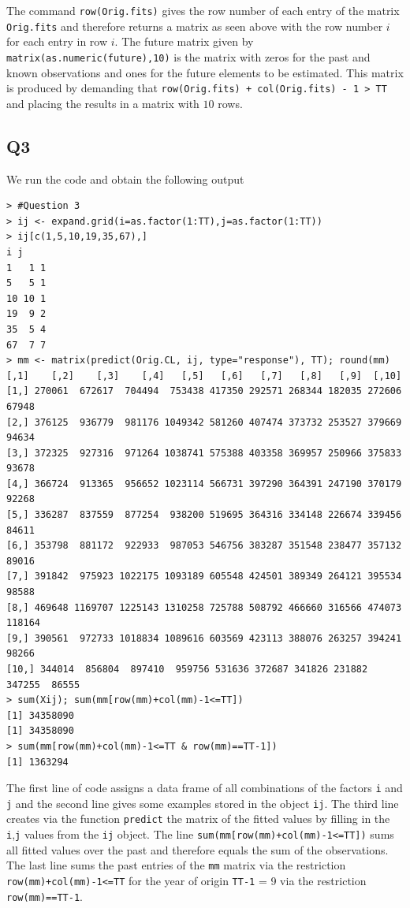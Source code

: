 \documentclass[11pt]{article}
\begin{document}
The command \verb|row(Orig.fits)| gives the row number of each entry of the matrix \verb|Orig.fits| and therefore returns a matrix as seen above with the row number $i$ for each entry in row $i$. The future matrix given by \verb|matrix(as.numeric(future),10)| is the matrix with zeros for the past and known observations and ones for the future elements to be estimated. This matrix is produced by demanding that \verb|row(Orig.fits) + col(Orig.fits) - 1 > TT| and placing the results in a matrix with $10$ rows.


\subsection*{Q3}
We run the code and obtain the following output

\begin{verbatim}
> #Question 3
> ij <- expand.grid(i=as.factor(1:TT),j=as.factor(1:TT))
> ij[c(1,5,10,19,35,67),]
i j
1   1 1
5   5 1
10 10 1
19  9 2
35  5 4
67  7 7
> mm <- matrix(predict(Orig.CL, ij, type="response"), TT); round(mm)
[,1]    [,2]    [,3]    [,4]   [,5]   [,6]   [,7]   [,8]   [,9]  [,10]
[1,] 270061  672617  704494  753438 417350 292571 268344 182035 272606  67948
[2,] 376125  936779  981176 1049342 581260 407474 373732 253527 379669  94634
[3,] 372325  927316  971264 1038741 575388 403358 369957 250966 375833  93678
[4,] 366724  913365  956652 1023114 566731 397290 364391 247190 370179  92268
[5,] 336287  837559  877254  938200 519695 364316 334148 226674 339456  84611
[6,] 353798  881172  922933  987053 546756 383287 351548 238477 357132  89016
[7,] 391842  975923 1022175 1093189 605548 424501 389349 264121 395534  98588
[8,] 469648 1169707 1225143 1310258 725788 508792 466660 316566 474073 118164
[9,] 390561  972733 1018834 1089616 603569 423113 388076 263257 394241  98266
[10,] 344014  856804  897410  959756 531636 372687 341826 231882 347255  86555
> sum(Xij); sum(mm[row(mm)+col(mm)-1<=TT])
[1] 34358090
[1] 34358090
> sum(mm[row(mm)+col(mm)-1<=TT & row(mm)==TT-1])
[1] 1363294
\end{verbatim}

The first line of code assigns a data frame of all combinations of the factors \verb|i| and \verb|j| and the second line gives some examples stored in the object \verb|ij|. The third line creates via the function \verb|predict| the matrix of the fitted values by filling in the \verb|i|,\verb|j| values from the \verb|ij| object. The line \verb|sum(mm[row(mm)+col(mm)-1<=TT])| sums all fitted values over the past and therefore equals the sum of the observations. The last line sums the past entries of the \verb|mm| matrix via the restriction \verb|row(mm)+col(mm)-1<=TT| for the year of origin \verb|TT-1| = 9 via the restriction \verb|row(mm)==TT-1|.
\end{document}
